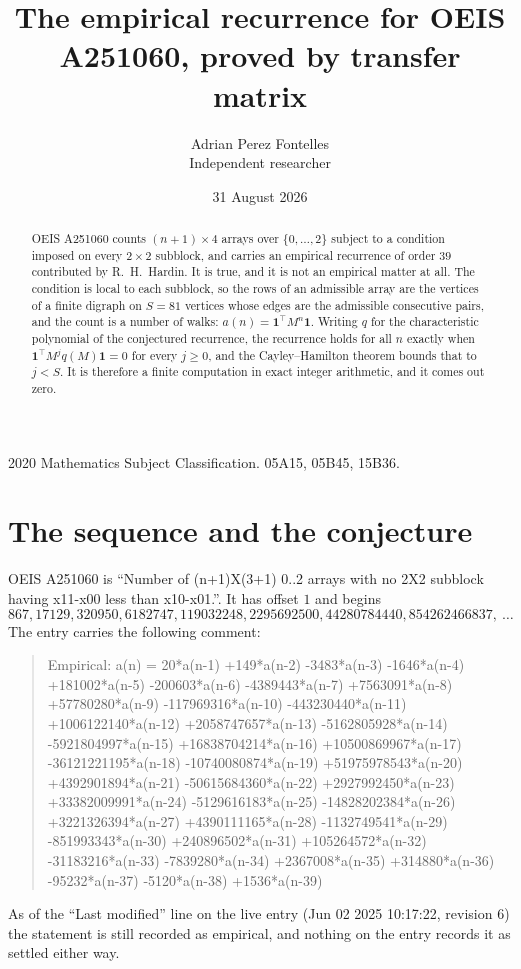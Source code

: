 \documentclass[11pt,a4paper]{article}
\title{The empirical recurrence for OEIS A251060, proved by transfer matrix}
\author{Adrian Perez Fontelles\\ \small Independent researcher}
\date{31 August 2026}
\theoremstyle{plain}
\theoremstyle{definition}
\begin{document}
\maketitle

\begin{abstract}
OEIS A251060 counts $(n+1)\times4$ arrays over $\{0,\dots,2\}$ subject to a condition imposed on
every $2\times2$ subblock, and carries an empirical recurrence of order $39$ contributed
by R.~H.~Hardin. It is true, and it is not an empirical matter at all. The condition is local
to each subblock, so the rows of an admissible array are the vertices of a finite digraph
on $S=81$ vertices whose edges are the admissible consecutive pairs, and the count is a
number of walks: $a(n)=\mathbf{1}^{\!\top}M^{n}\mathbf{1}$. Writing $q$
for the characteristic polynomial of the conjectured recurrence, the recurrence holds for all
$n$ exactly when $\mathbf{1}^{\!\top}M^{j}q(M)\mathbf{1}=0$ for every $j\ge0$, and the
Cayley--Hamilton theorem bounds that to $j<S$. It is therefore a finite computation in exact
integer arithmetic, and it comes out zero.
\end{abstract}

\noindent\small 2020 Mathematics Subject Classification. 05A15, 05B45, 15B36.\normalsize

\section{The sequence and the conjecture}

OEIS A251060 is ``Number of (n+1)X(3+1) 0..2 arrays with no 2X2 subblock having x11-x00 less than x10-x01.''. It has offset $1$ and begins
\[
867, 17129, 320950, 6182747, 119032248, 2295692500, 44280784440, 854262466837,\ \dots
\]
The entry carries the following comment:
\begin{quote}\small
Empirical: a(n) = 20*a(n-1) +149*a(n-2) -3483*a(n-3) -1646*a(n-4) +181002*a(n-5) -200603*a(n-6) -4389443*a(n-7) +7563091*a(n-8) +57780280*a(n-9) -117969316*a(n-10) -443230440*a(n-11) +1006122140*a(n-12) +2058747657*a(n-13) -5162805928*a(n-14) -5921804997*a(n-15) +16838704214*a(n-16) +10500869967*a(n-17) -36121221195*a(n-18) -10740080874*a(n-19) +51975978543*a(n-20) +4392901894*a(n-21) -50615684360*a(n-22) +2927992450*a(n-23) +33382009991*a(n-24) -5129616183*a(n-25) -14828202384*a(n-26) +3221326394*a(n-27) +4390111165*a(n-28) -1132749541*a(n-29) -851993343*a(n-30) +240896502*a(n-31) +105264572*a(n-32) -31183216*a(n-33) -7839280*a(n-34) +2367008*a(n-35) +314880*a(n-36) -95232*a(n-37) -5120*a(n-38) +1536*a(n-39)
\end{quote}
As of the ``Last modified'' line on the live entry (Jun 02 2025 10:17:22, revision 6) the statement is
still recorded as empirical, and nothing on the entry records it as settled either way.
\end{document}
